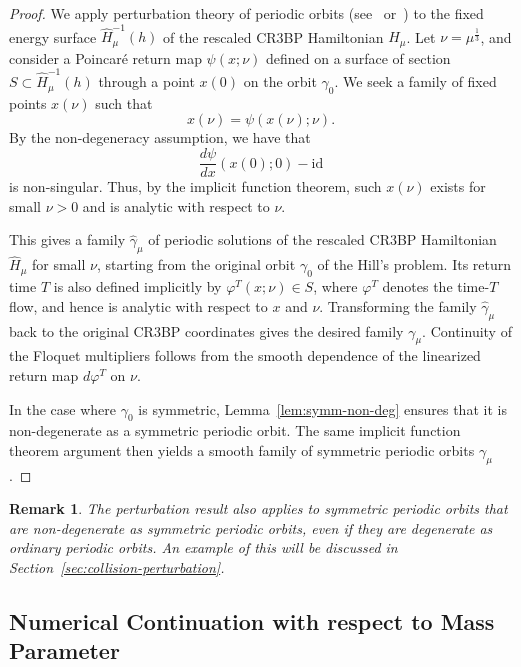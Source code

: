 \documentclass[pdflatex,sn-mathphys-ay]{sn-jnl}%
\theoremstyle{thmstyleone}%
\theoremstyle{thmstyletwo}%
\newtheorem{remark}{Remark}%
\theoremstyle{thmstylethree}%
\renewcommand{\phi}{\varphi}
\begin{document}
\begin{proof}
    We apply perturbation theory of periodic orbits (see~\cite[Theorem 2.2]{moser_zehnder_notes_2005} or~\cite[Section 9.1]{meyer_introduction-2ed_2009}) to the fixed energy surface $\hat{H}_\mu^{-1}(h)$ of the rescaled CR3BP Hamiltonian $\hat{H}_\mu$.
    Let $\nu = \mu^{\frac{1}{3}}$, and consider a Poincar\'e return map $\psi(x;\nu)$ defined on a surface of section $S\subset \hat{H}_\mu^{-1}(h)$ through a point $x(0)$ on the orbit $\gamma_0$. We seek a family of fixed points $x(\nu)$ such that 
    \[x(\nu) = \psi(x(\nu); \nu).\] 
    By the non-degeneracy assumption, we have that
    \[ \frac{d\psi}{dx}(x(0); 0) - \textrm{id}  \]
    is non-singular. Thus, by the implicit function theorem, such $x(\nu)$ exists for small $\nu>0$ and is analytic with respect to $\nu$. 
    
    This gives a family $\hat{\gamma}_\mu$ of periodic solutions of the rescaled CR3BP Hamiltonian $\hat{H}_\mu$ for small $\nu$, starting from the original orbit $\gamma_0$ of the Hill's problem. 
    Its return time $T$ is also defined implicitly by $\phi^T(x;\nu)\in S$, where $\phi^T$ denotes the time-$T$ flow, and hence is analytic with respect to $x$ and $\nu$. 
    Transforming the family $\hat{\gamma}_\mu$ back to the original CR3BP coordinates gives the desired family $\gamma_\mu$.
    Continuity of the Floquet multipliers follows from the smooth dependence of the linearized return map $d\phi^T$ on $\nu$. 
    
    In the case where $\gamma_0$ is symmetric, Lemma~\ref{lem:symm-non-deg} ensures that it is non-degenerate as a symmetric periodic orbit.  
    The same implicit function theorem argument then yields a smooth family of symmetric periodic orbits $\gamma_\mu$.  
\end{proof}

\begin{remark}
The perturbation result also applies to symmetric periodic orbits that are non-degenerate as symmetric periodic orbits, even if they are degenerate as ordinary periodic orbits.  
An example of this will be discussed in Section~\ref{sec:collision-perturbation}.
\end{remark}


\subsection{Numerical Continuation with respect to Mass Parameter}
\end{document}
